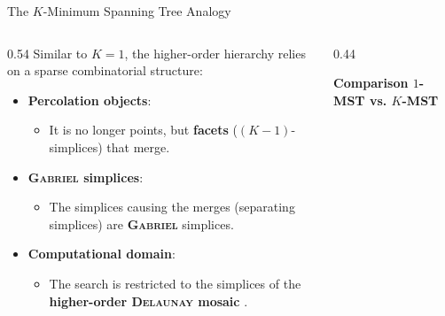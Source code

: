 \documentclass[A4,svgnames,9pt,aspectratio=169]{beamer}
\begin{document}
\begin{frame}{The $K$-Minimum Spanning Tree Analogy}
    \begin{columns}[c, onlytextwidth]
        \begin{column}{0.54\textwidth}
            Similar to $K=1$, the higher-order hierarchy relies on a sparse combinatorial structure:
            
            \vspace{0.3cm}
            \begin{itemize}
                \setlength{\itemsep}{10pt}
                \item \textbf{Percolation objects}:
                \begin{itemize}
                    \item It is no longer points, but \textbf{facets} ($(K-1)$-simplices) that merge.
                \end{itemize}
                \item \textbf{\textsc{Gabriel} simplices}:
                \begin{itemize}
                    \item The simplices causing the merges (separating simplices) are \textbf{\textsc{Gabriel}} simplices.
                \end{itemize}
                \item \textbf{Computational domain}:
                \begin{itemize}
                    \item The search is restricted to the simplices of the \textbf{higher-order \textsc{Delaunay} mosaic} \cite{osangEdelsbrunner2023algorithm}.
                \end{itemize}
            \end{itemize}
        \end{column}
        
        \begin{column}{0.44\textwidth}
            \begin{center}
                \textbf{Comparison $1$-MST vs. $K$-MST}
                

\end{center}
\end{column}
\end{columns}
\end{frame}
\end{document}
